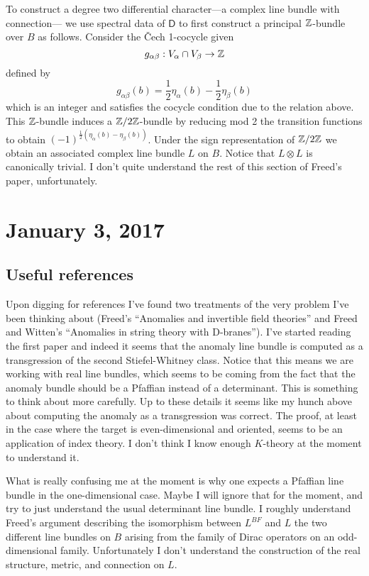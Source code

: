 \documentclass{amsart}
\begin{document}
To construct a degree two differential character---a complex line bundle with
connection--- we use spectral data of $\mathsf{D}$ to first construct a principal
$\mathbb{Z}$-bundle over $B$ as follows. Consider the \v Cech 1-cocycle given
\begin{equation*}
    g_{\alpha\beta}: V_\alpha\cap V_\beta \to \mathbb{Z}
\end{equation*}
defined by
\begin{equation*}
    g_{\alpha\beta}(b) = \frac{1}{2}\eta_\alpha(b) - \frac{1}{2}\eta_\beta(b)
\end{equation*}
which is an integer and satisfies the cocycle condition due to the relation above.
This $\mathbb{Z}$-bundle induces a $\mathbb{Z}/2\mathbb{Z}$-bundle by reducing mod 2 the transition functions
to obtain $(-1)^{\frac{1}{2}(\eta_\alpha(b)-\eta_\beta(b))}$.
Under the sign representation of $\mathbb{Z}/2\mathbb{Z}$ we obtain an associated complex
line bundle $L$ on $B$. Notice that $L\otimes L$ is canonically trivial.
I don't quite understand the rest of this section of Freed's paper, unfortunately.

\section{January 3, 2017}

\subsection{Useful references}

Upon digging for references I've found two treatments of the very problem
I've been thinking about (Freed's ``Anomalies and invertible field theories''
and Freed and Witten's ``Anomalies in string theory with D-branes''). I've
started reading the first paper and indeed it seems that the anomaly line
bundle is computed as a transgression of the second Stiefel-Whitney class.
Notice that this means we are working with real line bundles, which seems
to be coming from the fact that the anomaly bundle should be a Pfaffian
instead of a determinant. This is something to think about more carefully.
Up to these details it seems like my hunch above about computing the anomaly
as a transgression was correct.
The proof, at least in the case where the target is even-dimensional and
oriented, seems to be an application of index theory. I don't think I
know enough $K$-theory at the moment to understand it.

What is really confusing me at the moment is why one expects a Pfaffian
line bundle in the one-dimensional case. Maybe I will ignore that for the
moment, and try to just understand the usual determinant line bundle.
I roughly understand Freed's argument describing the isomorphism between
$L^{BF}$ and $L$ the two different line bundles on $B$ arising from the
family of Dirac operators on an odd-dimensional family. Unfortunately
I don't understand the construction of the real structure, metric, and
connection on $L$.


%
%
\end{document}
